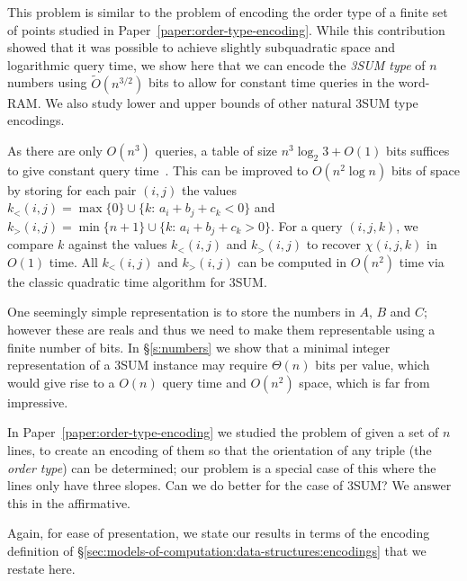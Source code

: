 This problem is similar to the problem of encoding the order
type of a finite set of points studied in Paper~\ref{paper:order-type-encoding}.
While this contribution showed that it was
possible to achieve slightly subquadratic space and logarithmic query time, we
show here that we can encode the \emph{3SUM type} of \(n\) numbers using
\(\tilde{O}(n^{3/2})\) bits to allow for constant time queries in the
word-RAM.
%
We also study lower and upper bounds of other natural 3SUM type encodings.

As there are only $O(n^3)$ queries, a table
of size $n^3 \log_2 3 + O(1)$ bits suffices to give constant query time~\cite{DPT10}.
%
This can be improved to $O(n^2\log n)$ bits of space by
storing for each pair $(i,j)$ the values
\(k_<(i,j) = \max \{ 0\}\cup \{k \colon\, a_i + b_j + c_k < 0\}\) and
\(k_>(i,j) = \min \{ n+1\}\cup \{k \colon\, a_i + b_j + c_k > 0\}\).
For a query \((i,j,k)\), we compare \(k\) against the values \(k_<(i,j)\) and \(k_>(i,j)\)
to recover \(\chi(i,j,k)\) in \(O(1)\) time. All \(k_<(i,j)\) and \(k_>(i,j)\)
can be computed in \(O(n^2)\) time via the classic quadratic time algorithm for
3SUM.

One seemingly simple representation is to store the numbers in $A$, $B$ and
$C$; however these are reals and thus we need to make them representable using
a finite number of bits.
In \S\ref{s:numbers} we show that a minimal integer representation of a
3SUM instance may require $\Theta(n)$ bits per value, which would give
rise to a $O(n)$ query time and $O(n^2)$ space, which is far from
impressive.
%


In Paper~\ref{paper:order-type-encoding}
we studied
the problem of given a set of $n$ lines, to create an
encoding of them so that the orientation of any triple (the \emph{order type})
can be determined; our problem is a special case of this where the
lines only have three slopes.
Can we do better for the case of 3SUM? We answer this in the affirmative.

Again, for ease of presentation, we state our results in terms of the encoding
definition of \S\ref{sec:models-of-computation:data-structures:encodings} that
we restate here.
%
\DefinitionEncoding*

